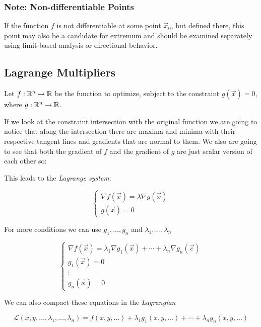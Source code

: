 \subsubsection{Note: Non-differentiable Points}

If the function \( f \) is not differentiable at some point \( \vec{x}_0 \), but defined there, this 
point may also be a candidate for extremum and should be examined separately using limit-based analysis 
or directional behavior.

\subsection{Lagrange Multipliers}

Let \( f : \mathbb{R}^n \to \mathbb{R} \) be the function to optimize, subject to the constraint 
\( g(\vec{x}) = 0 \), where \( g : \mathbb{R}^n \to \mathbb{R} \).  
\vspace{\baselineskip}

If we look at the constraint intersection with the original function we are going to notice that along 
the intersection there are maxima and minima with their respective tangent lines and gradients that are 
normal to them. We also are going to see that both the gradient of \(f\) and the gradient of \(g\) are just scalar version of each other so: 
\vspace{\baselineskip}

This leads to the \emph{Lagrange system}:

\[
    \begin{cases}
        \nabla f(\vec{x}) = \lambda \nabla g(\vec{x}) \\
        g(\vec{x}) = 0
    \end{cases}
\]

For more conditions  we can use \(g_1, \dots, g_n\) and \(\lambda_1, \dots, \lambda_n\)

\[
    \begin{cases}
        \nabla f(\vec{x}) = \lambda_1 \nabla g_1(\vec{x}) + \cdots + \lambda_n \nabla g_n(\vec{c}) \\
        g_1(\vec{x}) = 0 \\
        \vdots \\
        g_n(\vec{x}) = 0
    \end{cases}
\]

We can also compact these equations in the \emph{Lagrangian}

\[
    \mathcal{L}(x,y, \dots, \lambda_1, \dots, \lambda_n) = f(x, y, \dots) + \lambda_1 g_1(x, y, \dots) + 
    \cdots + \lambda_n g_n(x, y, \dots)
\]

